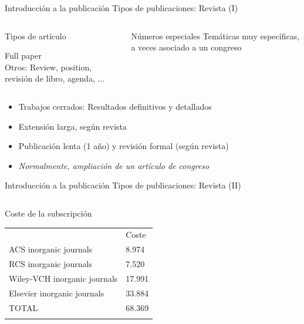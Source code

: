 \documentclass{beamer}
\begin{document}
\begin{frame}{Introducción a la publicación} {Tipos de publicaciones: Revista (I)}
	\begin{columns}
			\begin{block}{Tipos de artículo}
				\begin{center}
				Full paper\\
				Otros: Review, position, revisión de libro, agenda, ...
				\end{center}
			\end{block}
			\begin{block}{Números especiales}
				Temáticas muy específicas, a veces asociado a un congreso
			\end{block}
	\end{columns}
	\vspace{0.5cm}
	\begin{itemize}
		\item Trabajos cerrados: Resultados definitivos y detallados
		\item Extensión larga, según revista
		\item Publicación lenta (1 año) y revisión formal (según revista)
		\item \textit{Normalmente, ampliación de un artículo de congreso}
	\end{itemize}
\end{frame}

\begin{frame}{Introducción a la publicación} {Tipos de publicaciones: Revista (II)}
	\begin{columns}
		\column{.7\textwidth}
			\begin{block}{Coste de la subscripción}
				\scriptsize{
				\begin{table}[h]
				\begin{center}
				\begin{tabular}{ll}
				\hline\noalign{\smallskip}
				 		& Coste \\
				\noalign{\smallskip} 
				\hline 
				\noalign{\smallskip}
				ACS inorganic journals 			& 8.974  \\ 
				RCS inorganic journals 			& 7.520	 \\ 
				Wiley-VCH inorganic journals	& 17.991 \\ 
				Elsevier inorganic journals		& 33.884 \\ 
				\noalign{\smallskip} 
				\hline
				\noalign{\smallskip} 
				TOTAL							& 68.369 \\ 
				\noalign{\smallskip} 
				\hline
				\end{tabular}
				\end{center}
				\end{table}
			}

		\end{block}
	\end{columns}
	\vspace{0.5cm}
\end{frame}
\end{document}
